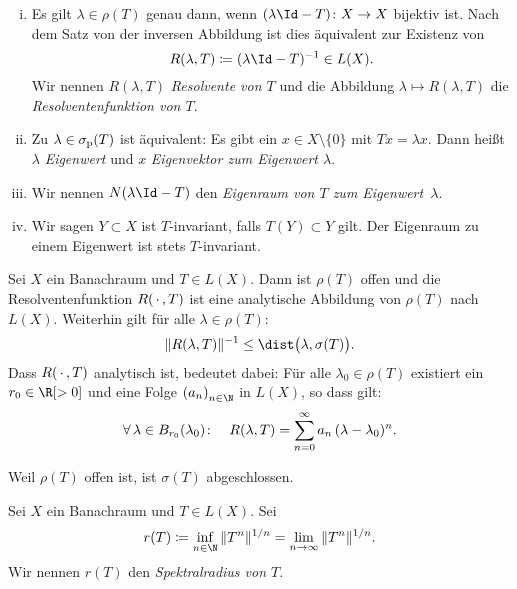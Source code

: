 \begin{thBemerkung}
    \begin{enumerate}[(i)]
        \item
            Es gilt $\lambda\in\rho(T)$ genau dann, wenn $(\lambda\Id-T)\colon X\to X$
            bijektiv ist. Nach dem Satz von der inversen Abbildung
             ist dies äquivalent
            zur Existenz von
            \[ R(\lambda,T) \defeq (\lambda\Id-T)^{-1} \in L(X)  . \]
            Wir nennen $R(\lambda,T)$ \emph{Resolvente von $T$} und die Abbildung
            $\lambda\mapsto R(\lambda,T)$ die \emph{Resolventenfunktion von $T$}.
            
        \item
            Zu $\lambda\in\sigmap(T)$ ist äquivalent: Es gibt ein $x\in
            X\setminus\{0\}$ mit $Tx=\lambda x$. Dann heißt $\lambda$
            \emph{Eigenwert} und $x$ \emph{Eigenvektor zum Eigenwert
            $\lambda$}.
            
        \item
            Wir nennen $N(\lambda\Id-T)$ den \emph{Eigenraum von $T$ zum
            Eigenwert~$\lambda$}.
            
        \item
            Wir sagen $Y\subset X$ ist $T$-invariant, falls $T(Y)\subset Y$
            gilt. Der Eigenraum zu einem Eigenwert ist stets $T$-invariant.
    \end{enumerate}
\end{thBemerkung}

\begin{thSatz}
    Sei $X$ ein Banachraum und $T\in L(X)$. Dann ist $\rho(T)$ offen und die
    Resolventenfunktion $R(\scdot,T)$ ist eine analytische Abbildung von
    $\rho(T)$ nach $L(X)$. Weiterhin gilt für alle $\lambda\in\rho(T)$:
    \[ \norm{R(\lambda,T)}^{-1} \leq \dist\bigl(\lambda, \sigma(T)\bigr) . \]
    Dass $R(\scdot,T)$ analytisch ist, bedeutet dabei: Für alle
    $\lambda_0\in\rho(T)$ existiert ein $r_0\in\R[>0]$ und eine Folge $\nSeq a$
    in $L(X)$, so dass gilt:
    \[ \forall\,\lambda\in B_{r_0}(\lambda_0)\colon\quad 
        R(\lambda,T) = \nsum[0]^\infty a_n \, (\lambda-\lambda_0)^n 
    . \]
\end{thSatz}


\nnBemerkung
Weil $\rho(T)$ offen ist, ist $\sigma(T)$ abgeschlossen.

\begin{thDef}
    Sei $X$ ein Banachraum und $T\in L(X)$. Sei
    \[ r(T) \defeq  \inf_{n\in\N} \, \norm{T^n}^{1/n}
        = \lim_{n\to\infty} \, \norm{T^n}^{1/n}
    . \]
    Wir nennen $r(T)$ den \emph{Spektralradius von $T$}.
\end{thDef}

